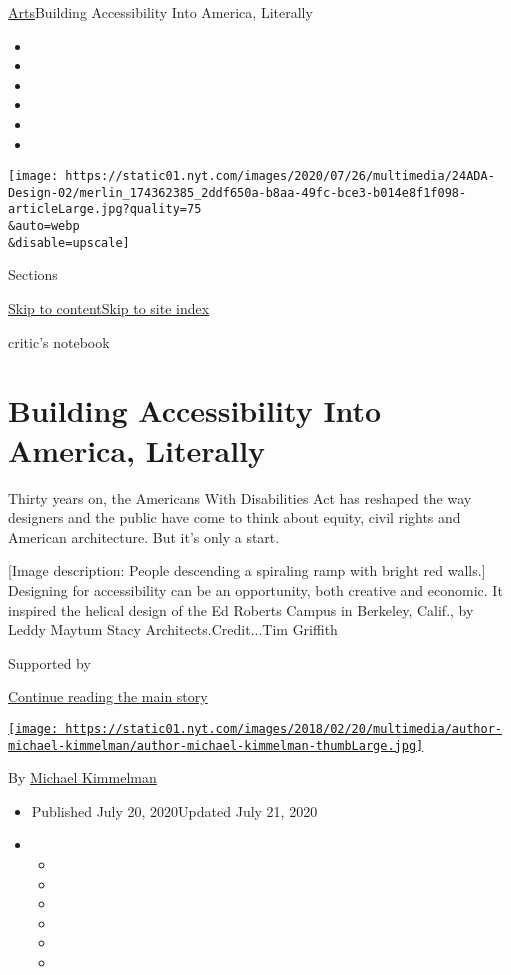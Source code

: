 \href{/section/arts}{Arts}\textbar{}Building Accessibility Into America,
Literally

\begin{itemize}
\item
\item
\item
\item
\item
\item
\end{itemize}

\texttt{[image: https://static01.nyt.com/images/2020/07/26/multimedia/24ADA-Design-02/merlin\_174362385\_2ddf650a-b8aa-49fc-bce3-b014e8f1f098-articleLarge.jpg?quality=75\\\&auto=webp\\\&disable=upscale]}

Sections

\protect\hyperlink{site-content}{Skip to
content}\protect\hyperlink{site-index}{Skip to site index}

critic's notebook

\hypertarget{building-accessibility-into-america-literally}{%
\section{Building Accessibility Into America,
Literally}\label{building-accessibility-into-america-literally}}

Thirty years on, the Americans With Disabilities Act has reshaped the
way designers and the public have come to think about equity, civil
rights and American architecture. But it's only a start.

{[}Image description: People descending a spiraling ramp with bright red
walls.{]} Designing for accessibility can be an opportunity, both
creative and economic. It inspired the helical design of the Ed Roberts
Campus in Berkeley, Calif., by Leddy Maytum Stacy
Architects.Credit...Tim Griffith

Supported by

\protect\hyperlink{after-sponsor}{Continue reading the main story}

\href{https://www.nytimes.com/by/michael-kimmelman}{\texttt{[image: https://static01.nyt.com/images/2018/02/20/multimedia/author-michael-kimmelman/author-michael-kimmelman-thumbLarge.jpg]}}

By \href{https://www.nytimes.com/by/michael-kimmelman}{Michael
Kimmelman}

\begin{itemize}
\item
  Published July 20, 2020Updated July 21, 2020
\item
  \begin{itemize}
  \item
  \item
  \item
  \item
  \item
  \item
  \end{itemize}
\end{itemize}

